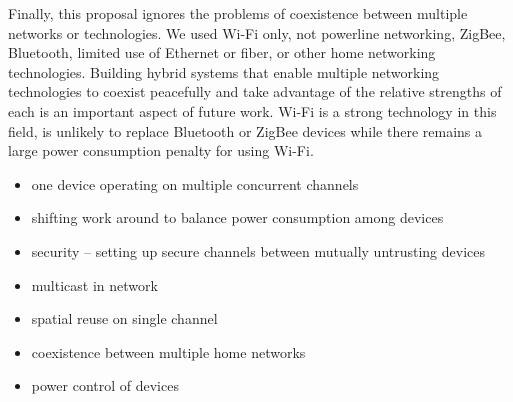 Finally, this proposal ignores the problems of coexistence between multiple networks or technologies. We used Wi-Fi only, not powerline networking, ZigBee, Bluetooth, limited use of Ethernet or fiber, or other home networking technologies. Building hybrid systems that enable multiple networking technologies to coexist peacefully and take advantage of the relative strengths of each is an important aspect of future work. Wi-Fi is a strong technology in this field, is unlikely to replace Bluetooth or ZigBee devices while there remains a large power consumption penalty for using Wi-Fi.

\begin{itemize}
\item one device operating on multiple concurrent channels
\item shifting work around to balance power consumption among devices
\item security -- setting up secure channels between mutually untrusting devices
\item multicast in network
\item spatial reuse on single channel
\item coexistence between multiple home networks
\item power control of devices
\end{itemize}
\fi